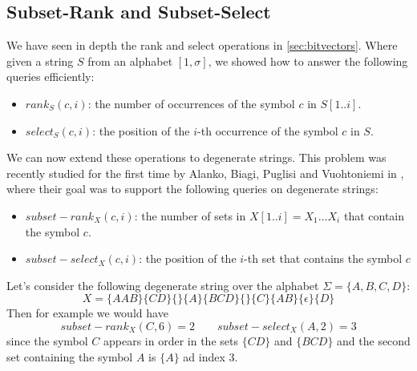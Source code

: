 \subsection{Subset-Rank and Subset-Select}
We have seen in depth the rank and select operations in \autoref{sec:bitvectors}. Where given a string $S$ from an alphabet $[1,\sigma]$, we showed how to answer the following queries efficiently:
\begin{itemize}
    \item $rank_S(c, i)$: the number of occurrences of the symbol $c$ in $S[1..i]$.
    \item $select_S(c, i)$: the position of the $i$-th occurrence of the symbol $c$ in $S$.
\end{itemize}
We can now extend these operations to degenerate strings. This problem was recently studied for the first time by Alanko, Biagi, Puglisi and Vuohtoniemi in \cite{SubsetWT}, where their goal was to support the following queries on degenerate strings:
\begin{itemize}
    \item $subset-rank_X(c, i)$: the number of sets in $X[1..i]=X_1 \dots X_i$ that contain the symbol $c$.
    \item $subset-select_X(c, i)$: the position of the $i$-th set that contains the symbol $c$
\end{itemize}
\begin{example}
    Let's consider the following degenerate string over the alphabet $\Sigma = \{A, B, C, D\}$:
    \[
        X = \{AAB\} \{CD\} \{\} \{A\} \{BCD\} \{\} \{C\} \{AB\} \{\epsilon\} \{D\}
    \]
    Then for example we would have
    \begin{equation*}
        subset-rank_X(C, 6) = 2 \qquad subset-select_X(A, 2) = 3
    \end{equation*}
    since the symbol $C$ appears in order in the sets $\{CD\}$ and $\{BCD\}$ and the second set containing the symbol $A$ is $\{A\}$ ad index $3$.
\end{example}
